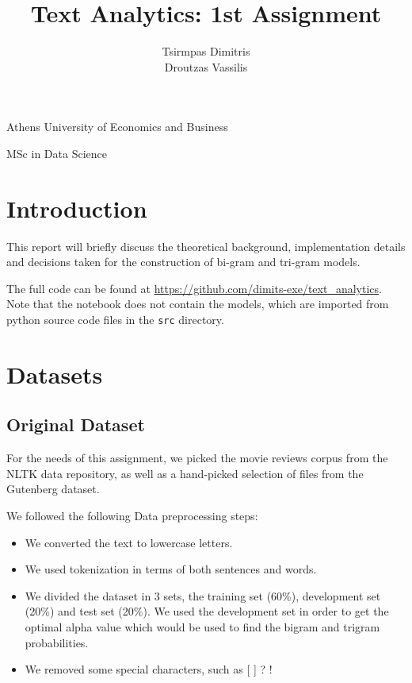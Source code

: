 \documentclass[11pt, a4paper]{article}
\title{\Huge Text Analytics: 1st Assignment}
\author{\LARGE Tsirmpas Dimitris\\\LARGE Droutzas Vassilis}
\begin{document}
	
	\begin{titlepage}
		\maketitle
		\begin{center}
			
			\large Athens University of Economics and Business
			
			\large MSc in Data Science
			
		\end{center}
		
	\end{titlepage}
	
	\tableofcontents
	\newpage	
	
	\section{Introduction}
	
	This report will briefly discuss the theoretical background, implementation details and decisions taken for the construction of bi-gram and tri-gram models.
	
	The full code can be found at \url{https://github.com/dimits-exe/text_analytics}. Note that the notebook does not contain the models, which are imported from python source code files in the \texttt{src} directory.
	
	\section{Datasets}
	
	
	\subsection{Original Dataset}
	
	For the needs of this assignment, we picked the movie reviews corpus from the NLTK data repository, as well as a hand-picked selection of files from the Gutenberg dataset. 
	
	We followed the following Data preprocessing steps:
	
	\begin{itemize}
		\item We converted the text to lowercase letters.
		\item We used tokenization in terms of both sentences and words.
		\item We divided the dataset in 3 sets, the training set (60\%), development set (20\%) and test set (20\%). We used the development set in order to get the optimal alpha value which would be used to find the bigram and trigram probabilities.
		\item We removed some special characters, such as [ ] ? !
		
	\end{itemize}
\end{document}
